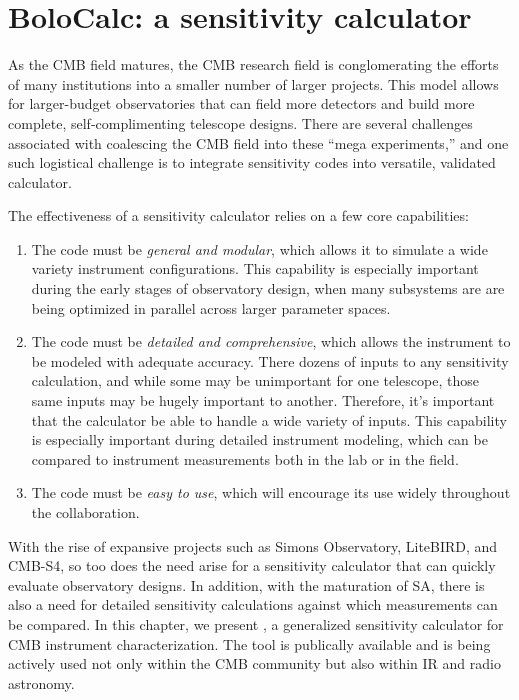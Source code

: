 \chapter{BoloCalc: a sensitivity calculator}
\label{ch:bolocalc}

As the CMB field matures, the CMB research field is conglomerating the efforts of many institutions into a smaller number of larger projects. This model allows for larger-budget observatories that can field more detectors and build more complete, self-complimenting telescope designs. There are several challenges associated with coalescing the CMB field into these ``mega experiments,'' and one such logistical challenge is to integrate sensitivity codes into versatile, validated calculator. 

The effectiveness of a sensitivity calculator relies on a few core capabilities:
\medskip
\begin{enumerate}
    \item The code must be \textit{general and modular}, which allows it to simulate a wide variety instrument configurations. This capability is especially important during the early stages of observatory design, when many subsystems are are being optimized in parallel across larger parameter spaces.
    \item The code must be \textit{detailed and comprehensive}, which allows the instrument to be modeled with adequate accuracy. There dozens of inputs to any sensitivity calculation, and while some may be unimportant for one telescope, those same inputs may be hugely important to another. Therefore, it's important that the calculator be able to handle a wide variety of inputs. This capability is especially important during detailed instrument modeling, which can be compared to instrument measurements both in the lab or in the field.
    \item The code must be \textit{easy to use}, which will encourage its use widely throughout the collaboration.
\end{enumerate}
\medskip

With the rise of expansive projects such as Simons Observatory, LiteBIRD, and CMB-S4, so too does the need arise for a sensitivity calculator that can quickly evaluate observatory designs. In addition, with the maturation of SA, there is also a need for detailed sensitivity calculations against which measurements can be compared. In this chapter, we present , a generalized sensitivity calculator for CMB instrument characterization. The tool is publically available and is being actively used not only within the CMB community but also within IR and radio astronomy.

